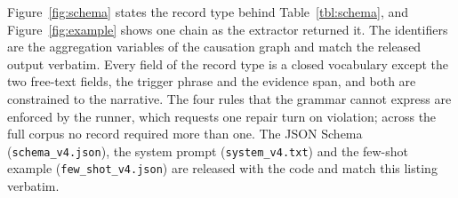 
Figure~\ref{fig:schema} states the record type behind Table~\ref{tbl:schema},
and Figure~\ref{fig:example} shows one chain as the extractor returned it.
The identifiers are the aggregation variables of the causation graph and
match the released output verbatim. Every field of the record
type is a closed vocabulary except the two free-text fields, the trigger
phrase and the evidence span, and both are constrained to the narrative. The
four rules that the grammar cannot express are enforced by the runner, which
requests one repair turn on violation; across the full corpus no record
required more than one. The JSON Schema
(\texttt{schema\_v4.json}), the system prompt (\texttt{system\_v4.txt}) and
the few-shot example (\texttt{few\_shot\_v4.json}) are released with the
code and match this listing verbatim.

